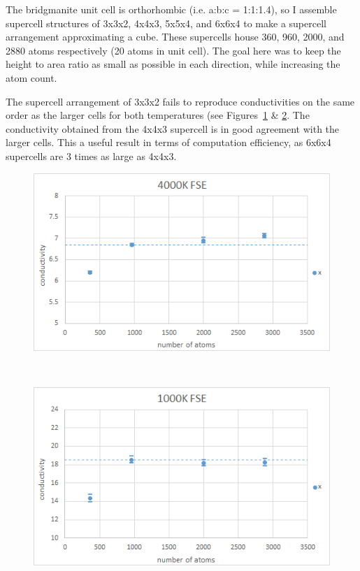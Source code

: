 The bridgmanite unit cell is orthorhombic (i.e. a:b:c = 1:1:1.4), so I assemble supercell structures of 3x3x2, 4x4x3, 5x5x4, and 6x6x4 to make a supercell arrangement approximating a cube. These supercells house 360, 960, 2000, and 2880 atoms respectively (20 atoms in unit cell). The goal here was to keep the height to area ratio as small as possible in each direction, while increasing the atom count.

The supercell arrangement of 3x3x2 fails to reproduce conductivities on the same order as the larger cells for both temperatures (see Figures~\ref{fig:gk_fse_4K} \& \ref{fig:gk_fse_1K}. The conductivity obtained from the 4x4x3 supercell is in good agreement with the larger cells. This a useful result in terms of computation efficiency, as 6x6x4 supercells are 3 times as large as 4x4x3.

\begin{figure}[]
\includegraphics[width=\linewidth]{Figures/gk_fse_4K_draft.png}
\caption[gk fse 4k]{}
\label{fig:gk_fse_4K}
\end{figure}
~
\begin{figure}[]
\includegraphics[width=\linewidth]{Figures/gk_fse_1K_draft.png}
\caption[gk fse 1k]{}
\label{fig:gk_fse_1K}
\end{figure}


